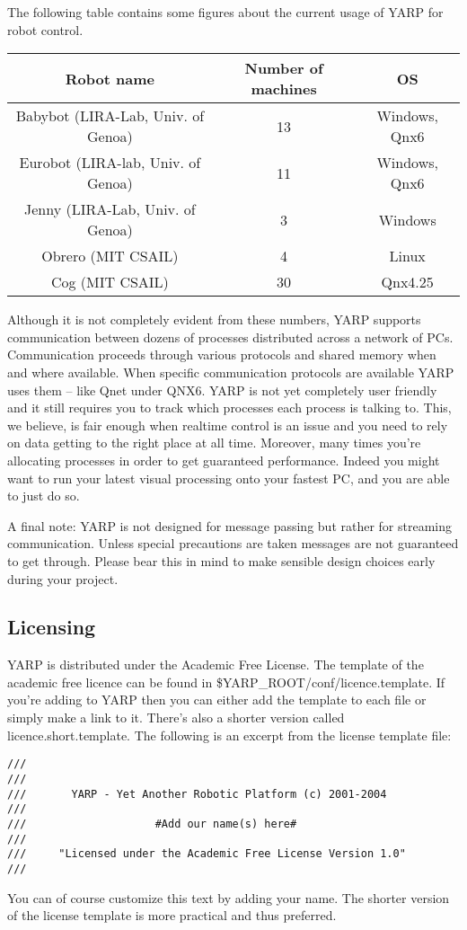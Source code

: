 The following table contains some figures about the current usage of YARP for robot control.
\begin{table}[h]
	\centering
		\begin{tabular}{|c|c|c|}
		\hline
			Robot name & Number of machines & OS \\
			\hline \hline
			Babybot (LIRA-Lab, Univ. of Genoa) & 13 & Windows, Qnx6 \\
			\hline
			Eurobot (LIRA-lab, Univ. of Genoa) & 11 & Windows, Qnx6 \\
			\hline
			Jenny (LIRA-Lab, Univ. of Genoa) & 3 & Windows \\
			\hline
			Obrero (MIT CSAIL) & 4 & Linux \\
			\hline
			Cog (MIT CSAIL) & 30 & Qnx4.25 \\
			\hline
		\end{tabular}
\end{table}

Although it is not completely evident from these numbers, YARP supports communication between dozens of processes distributed across a network of PCs. Communication proceeds through various protocols and shared memory when and where available. When specific communication protocols are available YARP uses them -- like Qnet under QNX6. YARP is not yet completely user friendly and it still requires you to track which processes each process is talking to. This, we believe, is fair enough when realtime control is an issue and you need to rely on data getting to the right place at all time. Moreover, many times you're allocating processes in order to get guaranteed performance. Indeed you might want to run your latest visual processing onto your fastest PC, and you are able to just do so.

A final note: YARP is not designed for message passing but rather for streaming communication. Unless special precautions are taken messages are not guaranteed to get through. Please bear this in mind to make sensible design choices early during your project.

\subsection{Licensing}
YARP is distributed under the Academic Free License. The template of the academic
free licence can be found in \$YARP\_ROOT/conf/licence.template. If you're adding to YARP then you can either add the template to each file or simply make a link to it. There's also a shorter version called licence.short.template. The following is an excerpt from the license template file:

\begin{verbatim}
///
///
///       YARP - Yet Another Robotic Platform (c) 2001-2004 
///
///                    #Add our name(s) here#
///
///     "Licensed under the Academic Free License Version 1.0"
///
\end{verbatim}

You can of course customize this text by adding your name. The shorter version of the license template is more practical and thus preferred.